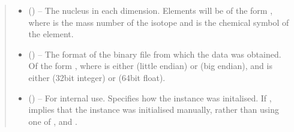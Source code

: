 \documentclass[letterpaper,10pt,english]{sphinxmanual}
\begin{document}
\begin{fulllineitems}
\begin{quote}
\begin{description}
\begin{itemize}
\item {} 
\sphinxAtStartPar
{} (\sphinxstyleliteralemphasis{\sphinxupquote{{[}}}\sphinxstyleliteralemphasis{\sphinxupquote{{]} or }}\sphinxstyleliteralemphasis{\sphinxupquote{{[}}}\sphinxstyleliteralemphasis{\sphinxupquote{, }}\sphinxstyleliteralemphasis{\sphinxupquote{{]} or }}) – The nucleus in each dimension. Elements will be of the form
, where  is the mass number of the
isotope and  is the chemical symbol of the element.

\item {} 
\sphinxAtStartPar
{} () – The format of the binary file from which the data was obtained.
Of the form , where  is either
 (little endian) or  (big endian), and 
is either  (32\sphinxhyphen{}bit integer) or  (64\sphinxhyphen{}bit float).

\item {} 
\sphinxAtStartPar
{} (\sphinxstyleliteralemphasis{\sphinxupquote{, }}) – For internal use. Specifies how the instance was initalised. If ,
implies that the instance was initialised manually, rather than using
one of {\hyperref[\detokenize{references/core:nmrespy.core.Estimator.new_bruker}]{}}, 
and .

\end{itemize}

\end{description}\end{quote}


\end{fulllineitems}
\end{document}
